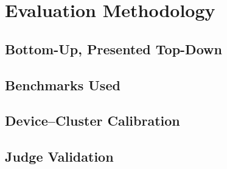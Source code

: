 \section{Evaluation Methodology}
\label{sec:methodology}


\subsection{Bottom-Up, Presented Top-Down}

\subsection{Benchmarks Used}

\subsection{Device--Cluster Calibration}

\subsection{Judge Validation}

